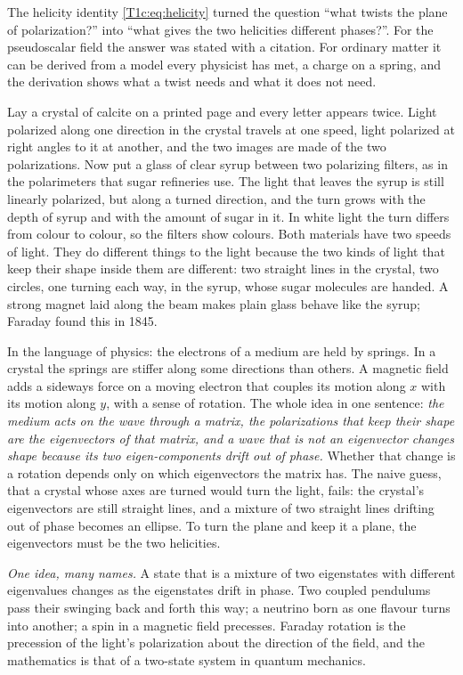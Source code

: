 The helicity identity \eqref{T1c:eq:helicity} turned the question ``what twists the plane of polarization?'' into ``what gives the two helicities different phases?''. For the pseudoscalar field the answer was stated with a citation. For ordinary matter it can be derived from a model every physicist has met, a charge on a spring, and the derivation shows what a twist needs and what it does not need.

Lay a crystal of calcite on a printed page and every letter appears twice. Light polarized along one direction in the crystal travels at one speed, light polarized at right angles to it at another, and the two images are made of the two polarizations. Now put a glass of clear syrup between two polarizing filters, as in the polarimeters that sugar refineries use. The light that leaves the syrup is still linearly polarized, but along a turned direction, and the turn grows with the depth of syrup and with the amount of sugar in it. In white light the turn differs from colour to colour, so the filters show colours. Both materials have two speeds of light. They do different things to the light because the two kinds of light that keep their shape inside them are different: two straight lines in the crystal, two circles, one turning each way, in the syrup, whose sugar molecules are handed. A strong magnet laid along the beam makes plain glass behave like the syrup; Faraday found this in 1845.

In the language of physics: the electrons of a medium are held by springs. In a crystal the springs are stiffer along some directions than others. A magnetic field adds a sideways force on a moving electron that couples its motion along $x$ with its motion along $y$, with a sense of rotation. The whole idea in one sentence: \emph{the medium acts on the wave through a matrix, the polarizations that keep their shape are the eigenvectors of that matrix, and a wave that is not an eigenvector changes shape because its two eigen-components drift out of phase.} Whether that change is a rotation depends only on which eigenvectors the matrix has. The naive guess, that a crystal whose axes are turned would turn the light, fails: the crystal's eigenvectors are still straight lines, and a mixture of two straight lines drifting out of phase becomes an ellipse. To turn the plane and keep it a plane, the eigenvectors must be the two helicities.

\emph{One idea, many names.} A state that is a mixture of two eigenstates with different eigenvalues changes as the eigenstates drift in phase. Two coupled pendulums pass their swinging back and forth this way; a neutrino born as one flavour turns into another; a spin in a magnetic field precesses. Faraday rotation is the precession of the light's polarization about the direction of the field, and the mathematics is that of a two-state system in quantum mechanics.

